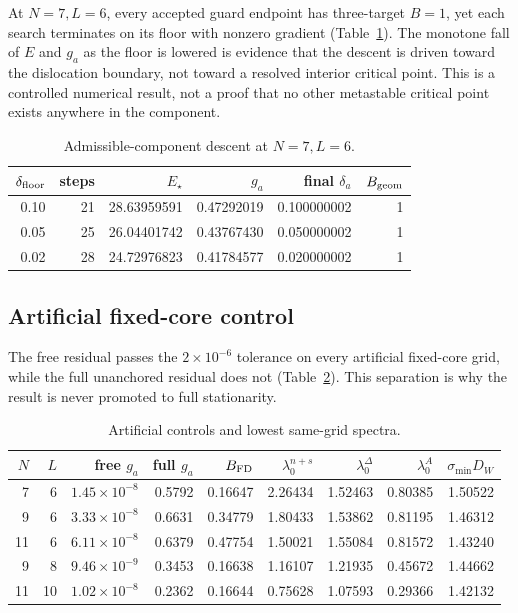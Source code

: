 \documentclass[11pt]{article}
\theoremstyle{definition}
\theoremstyle{remark}
\begin{document}
At $N=7,L=6$, every accepted guard endpoint has three-target $B=1$, yet each
search terminates on its floor with nonzero gradient
(Table~\ref{tab:guard}). The
monotone fall of $E$ and $g_a$ as the floor is lowered is evidence that the
descent is driven toward the dislocation boundary, not toward a resolved
interior critical point. This is a controlled numerical result, not a proof
that no other metastable critical point exists anywhere in the component.

\begin{table}[htbp]
\centering
\small
\caption{Admissible-component descent at $N=7,L=6$.}
\label{tab:guard}
\begin{tabular}{rrrrrr}
\toprule
$\delta_{\rm floor}$&steps&$E_\star$&$g_a$&final $\delta_a$&$B_{\rm geom}$\\
\midrule
0.10&21&28.63959591&0.47292019&0.100000002&1\\
0.05&25&26.04401742&0.43767430&0.050000002&1\\
0.02&28&24.72976823&0.41784577&0.020000002&1\\
\bottomrule
\end{tabular}
\end{table}

\subsection{Artificial fixed-core control}

The free residual passes the $2\times10^{-6}$ tolerance on every artificial
fixed-core grid, while the full unanchored residual does not
(Table~\ref{tab:anchor-spectrum}). This separation is why the result is never
promoted to full stationarity.

\begin{table}[htbp]
\centering
\scriptsize
\caption{Artificial controls and lowest same-grid spectra.}
\label{tab:anchor-spectrum}
\begin{tabular}{rrrrrrrrr}
\toprule
$N$&$L$&free $g_a$&full $g_a$&$B_{\rm FD}$&
$\lambda_0^{n+s}$&$\lambda_0^\Delta$&$\lambda_0^A$&$\sigma_{\min}D_W$\\
\midrule
7&6&$1.45\times10^{-8}$&0.5792&0.16647&2.26434&1.52463&0.80385&1.50522\\
9&6&$3.33\times10^{-8}$&0.6631&0.34779&1.80433&1.53862&0.81195&1.46312\\
11&6&$6.11\times10^{-8}$&0.6379&0.47754&1.50021&1.55084&0.81572&1.43240\\
9&8&$9.46\times10^{-9}$&0.3453&0.16638&1.16107&1.21935&0.45672&1.44662\\
11&10&$1.02\times10^{-8}$&0.2362&0.16644&0.75628&1.07593&0.29366&1.42132\\
\bottomrule
\end{tabular}
\end{table}
\end{document}
